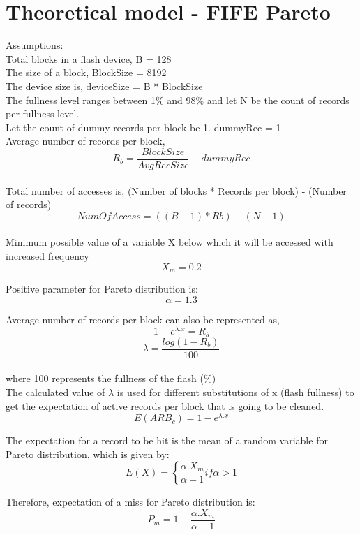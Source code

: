 \documentclass[11pt]{report} %
\begin{document}
\section{Theoretical model - FIFE Pareto}
Assumptions:\\
Total blocks in a flash device, B = 128\\
The size of a block, BlockSize = 8192\\
The device size is, deviceSize = B * BlockSize\\
The fullness level ranges between 1\% and 98\% and let N be the count of records per fullness level.\\
Let the count of dummy records per block be 1. dummyRec = 1\\
Average number of records per block, 
\begin{equation}R_b = \frac{BlockSize}{AvgRecSize} - dummyRec\end{equation}\\


Total number of accesses is, (Number of blocks * Records per block) - (Number of records)\\
\begin{equation}NumOfAccess = ((B-1) * Rb) -  (N-1)\end{equation}\\

Minimum possible value of a variable X below which it will be accessed with increased frequency
$$X_m = 0.2$$

Positive parameter for Pareto distribution is: 
$$\alpha = 1.3 $$


Average number of records per block can also be represented as, 
$$1-e^{\lambda . x} = R_b$$
$$\lambda = \frac{log(1 - R_b)}{100}$$\\
where 100 represents the fullness of the flash (\%)\\

The calculated value of $\lambda$ is used for different substitutions of x (flash fullness)  to get the expectation of active records per block that is going to be cleaned.
$$E(ARB_c) = 1-e^{\lambda . x}$$

The expectation for a record to be hit is the mean of a random variable for Pareto distribution, which is given by:\\
$$E(X) = \left\{\frac{\alpha . X_m}{\alpha - 1} \right.  if \alpha > 1$$

Therefore, expectation of a miss for Pareto distribution is:
$$P_m = 1 - \frac{\alpha . X_m}{\alpha - 1} $$
\end{document}
